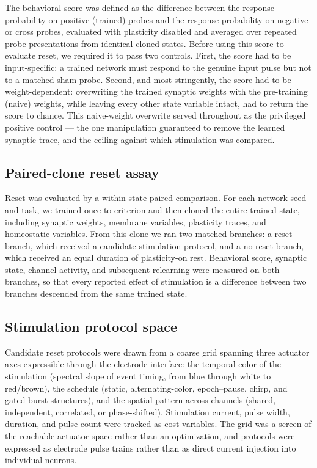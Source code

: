 \documentclass{article}
\begin{document}
The behavioral score was defined as the difference between the response probability on positive (trained) probes and the response probability on negative or cross probes, evaluated with plasticity disabled and averaged over repeated probe presentations from identical cloned states. Before using this score to evaluate reset, we required it to pass two controls. First, the score had to be input-specific: a trained network must respond to the genuine input pulse but not to a matched sham probe. Second, and most stringently, the score had to be weight-dependent: overwriting the trained synaptic weights with the pre-training (naive) weights, while leaving every other state variable intact, had to return the score to chance. This naive-weight overwrite served throughout as the privileged positive control --- the one manipulation guaranteed to remove the learned synaptic trace, and the ceiling against which stimulation was compared.

\subsection{Paired-clone reset assay}

Reset was evaluated by a within-state paired comparison. For each network seed and task, we trained once to criterion and then cloned the entire trained state, including synaptic weights, membrane variables, plasticity traces, and homeostatic variables. From this clone we ran two matched branches: a reset branch, which received a candidate stimulation protocol, and a no-reset branch, which received an equal duration of plasticity-on rest. Behavioral score, synaptic state, channel activity, and subsequent relearning were measured on both branches, so that every reported effect of stimulation is a difference between two branches descended from the same trained state.

\subsection{Stimulation protocol space}

Candidate reset protocols were drawn from a coarse grid spanning three actuator axes expressible through the electrode interface: the temporal color of the stimulation (spectral slope of event timing, from blue through white to red/brown), the schedule (static, alternating-color, epoch--pause, chirp, and gated-burst structures), and the spatial pattern across channels (shared, independent, correlated, or phase-shifted). Stimulation current, pulse width, duration, and pulse count were tracked as cost variables. The grid was a screen of the reachable actuator space rather than an optimization, and protocols were expressed as electrode pulse trains rather than as direct current injection into individual neurons.
\end{document}

